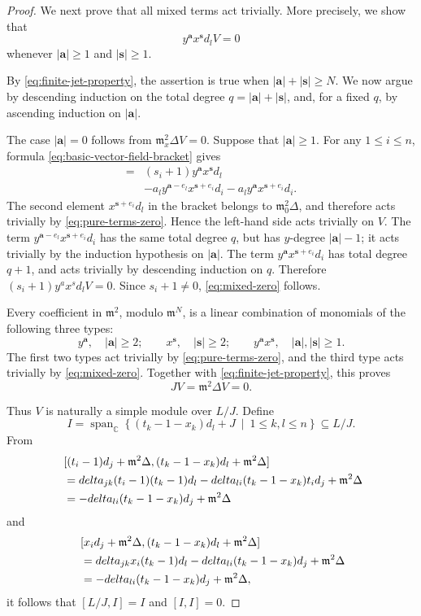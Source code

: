 \documentclass[10pt,a4paper]{amsart}
\def\ba{\mathbf{a}}
\def\bs{\mathbf{s}}
\def\delta{delta}%
\def\mm{\mathfrak{m}}
\begin{document}
\begin{proof}
We next prove that all mixed terms act trivially. More precisely,
we show that
\begin{equation}\label{eq:mixed-zero}
y^\ba x^\bs d_lV=0
\end{equation}
whenever \(|\ba|\geq1\) and \(|\bs|\geq1\).

By \eqref{eq:finite-jet-property}, the assertion is true when
\(|\ba|+|\bs|\geq N\). We now argue by descending induction on the total
degree
$q=|\ba|+|\bs|$,
and, for a fixed $q$, by ascending induction on \(|\ba|\).

The case \(|\ba|=0\) follows from
\(\mathfrak m_x^2\Delta V=0\). Suppose that \(|\ba|\geq1\).
For any \(1\leq i\leq n\), formula
\eqref{eq:basic-vector-field-bracket} gives
\begin{align*}
[y^\ba d_i,x^{\bs+e_i}d_l]
={}&
(s_i+1)y^\ba x^\bs d_l\\
&-
a_l y^{\ba-e_l}x^{\bs+e_i}d_i
-
a_l y^\ba x^{\bs+e_i}d_i.
\end{align*}
The second element \(x^{\bs+e_i}d_l\) in the bracket
 belongs to \(\mathfrak m_0^2\Delta\), and therefore
acts trivially by \eqref{eq:pure-terms-zero}. Hence the left-hand
side acts trivially on \(V\).
The term
$y^{\ba-e_l}x^{\bs+e_i}d_i$
has the same total degree \(q\), but has \(y\)-degree \(|\ba|-1\);
it acts trivially by the induction hypothesis on \(|\ba|\).
The term $y^\ba x^{\bs+e_i}d_i$
has total degree \(q+1\), and acts trivially by descending induction
on \(q\). Therefore
$(s_i+1)y^ax^sd_lV=0$.
Since \(s_i+1\neq0\),  \eqref{eq:mixed-zero} follows.

Every coefficient in \(\mathfrak m^2\), modulo \(\mathfrak m^N\),
is a linear combination of monomials of the following three types:
\[
y^\ba,\quad |\ba|\geq2;
\qquad
x^\bs,\quad |\bs|\geq2;
\qquad
y^\ba x^\bs,\quad |\ba|,|\bs|\geq1.
\]
The first two types act trivially by
\eqref{eq:pure-terms-zero}, and the third type acts trivially by
\eqref{eq:mixed-zero}. Together with
\eqref{eq:finite-jet-property}, this proves
\begin{equation}\label{eq:J-zero}
JV=\mathfrak m^2\Delta V=0.
\end{equation}

Thus \(V\) is naturally a simple module over \(L/J\). Define
\[
I=
\operatorname{span}_{\mathbb C}
\left\{
(t_k-1-x_k)d_l+J
\ \middle|\
1\leq k,l\leq n
\right\}
\subseteq L/J.
\]
From $$\aligned \
&[(t_i-1)d_j+\mm^2\Delta,(t_k-1-x_k)d_l+\mm^2\Delta]\\
&=\delta_{jk}(t_i-1)(t_k-1)d_l
-\delta_{li}(t_k-1-x_k)t_id_j+\mm^2\Delta\\
&=-\delta_{li}(t_k-1-x_k)d_j+\mm^2\Delta
\endaligned $$
and
$$\aligned \
&[x_id_j+\mm^2\Delta,(t_k-1-x_k)d_l+\mm^2\Delta]\\
&=\delta_{jk}x_i(t_k-1)d_l
-\delta_{li}(t_k-1-x_k)d_j+\mm^2\Delta\\
&=-\delta_{li}(t_k-1-x_k)d_j+\mm^2\Delta,
\endaligned $$
it follows that $[L/J,I]=I$ and $[I,I]=0$.


\end{proof}
\end{document}
